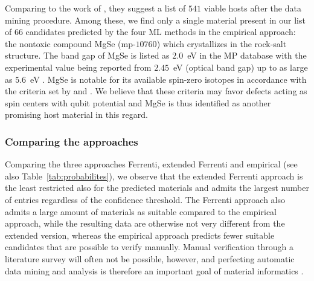 \documentclass[superscriptaddress,unsortedaddress,
 amsmath,amssymb,
 aps,
]{revtex4-2}
\begin{document}
Comparing to the work of \citeauthor{Ferrenti2020} \cite{Ferrenti2020}, they suggest a list of $541$ viable hosts after the data mining procedure.  
Among these, we find only a single material present in our list of $66$ candidates predicted by the four ML methods in the empirical approach: the nontoxic compound MgSe (mp-$10760$) which crystallizes in the rock-salt structure. The band gap of MgSe is listed as $2.0$~eV in the MP database with the experimental value being reported from $2.45$~eV (optical band gap) \cite{Ubale2014} up to as large as $5.6$~eV \cite{SaumGeorge1959}. MgSe is notable for its available spin-zero isotopes in accordance with the criteria set by \citeauthor{Weber2010} \cite{Weber2010} and \citeauthor{Ferrenti2020} \cite{Ferrenti2020}. We believe that these criteria may favor defects acting as spin centers with qubit potential and MgSe is thus identified as another promising host material in this regard.   

\subsubsection*{Comparing the approaches}
Comparing the three approaches Ferrenti, extended Ferrenti and empirical (see also Table~\ref{tab:probabilites}), we observe that the extended Ferrenti approach is the least restricted also for the predicted materials and admits the largest number of entries regardless of the confidence threshold.
The Ferrenti approach also admits a large amount of materials as suitable compared to the empirical approach, while the resulting data are otherwise not very different from the extended version, whereas the empirical approach predicts fewer suitable candidates that are possible to verify manually. 
Manual verification through a literature survey will often not be possible, however, and perfecting automatic data mining and analysis is therefore an important goal of material informatics \cite{rickman2019}. 
\end{document}
